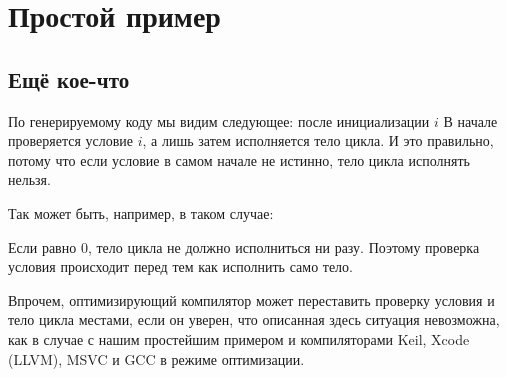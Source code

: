 \section{Простой пример}





\subsection{Ещё кое-что}

По генерируемому коду мы видим следующее: после инициализации $i$%
В начале проверяется условие $i$, а лишь затем исполняется тело цикла.
И это правильно, потому что если условие в самом начале не истинно, тело цикла исполнять нельзя.

Так может быть, например, в таком случае:



Если  равно 0,
тело цикла не должно исполниться ни разу.
Поэтому проверка условия происходит перед тем как исполнить само тело.

Впрочем, оптимизирующий компилятор может переставить проверку условия и тело цикла местами, если он уверен,
что описанная здесь ситуация невозможна, как в случае с нашим простейшим примером и компиляторами 
Keil, Xcode (LLVM), MSVC и GCC в режиме оптимизации.

